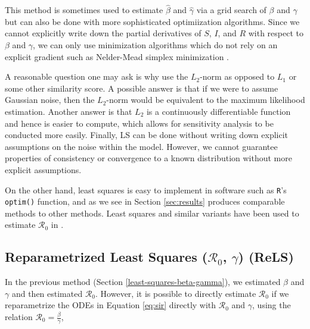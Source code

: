\message{ !name(draft_v13.tex)}\documentclass[12pt]{article}
\newcommand{\rr}{\ensuremath{\mathcal{R}_0}}
\begin{document}
This method is sometimes used to estimate $\hat{\beta}$ and $\hat{\gamma}$ via a grid search of $\beta$ and $\gamma$ but can also be done with more sophisticated optimiization algorithms.  Since we cannot explicitly write down the partial derivatives of $S$, $I$, and $R$ with respect to $\beta$ and $\gamma$, we can only use minimization algorithms which do not rely on an explicit gradient such as Nelder-Mead simplex minimization \citep{nelder-mead1965}.

A reasonable question one may ask is why use the $L_2$-norm as opposed to $L_1$ or some other similarity score.  A possible answer is that if we were to assume Gaussian noise, then the $L_2$-norm would be equivalent to the maximum likelihood estimation.  Another answer is that $L_2$ is a continuously differentiable function and hence is easier to compute, which allows for sensitivity analysis to  be conducted more easily.  Finally, LS can be done without writing down explicit assumptions on the noise within the model.  However, we cannot guarantee properties of consistency or convergence to a known distribution without more explicit assumptions.  

On the other hand, least squares is easy to implement in software such as \texttt{R}'s \texttt{optim()} function, and as we see in Section \ref{sec:results} produces comparable methods to other methods.  Least squares and similar variants have been used to estimate $\rr$ in \cite{majumder2016}.

\subsection{Reparametrized Least Squares ($\rr$, $\gamma$) (ReLS)}\label{reparametrized-least-squares-rux5f0-gamma}

In the previous method (Section \ref{least-squares-beta-gamma}), we estimated $\beta$ and $\gamma$ and then estimated $\rr$.  However, it is possible to directly estimate $\rr$ if we reparametrize the ODEs in Equation \eqref{eq:sir} directly with \(\rr\) and \(\gamma\), using the relation $\rr = \frac{\beta}{\gamma}$,
\end{document}
